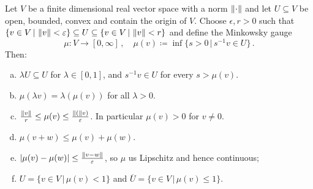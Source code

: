 \begin{lemma}\label{lem:orient-MinkowskyGauge}
    Let $V$ be a finite dimensional real vector space with a norm $\left\lVert\cdot\right\rVert$ and let $U\subseteq V$ be open, bounded, convex and contain the origin of $V$. Choose $\epsilon,r>0$ such that
    $\{v\in V\,|\, \left\lVert v\right\rVert< \varepsilon\}\subseteq U\subseteq \{v\in V\,|\,\left\lVert v\right\rVert<r\}$
    and define the Minkowsky gauge
\begin{equation*}
        \mu: V \to [0,\infty]\,,\quad \mu(v)\coloneq \inf\{s>0\,|\, s^{-1}v\in U\}\,.
    \end{equation*} 
    Then:
    \begin{enumerate}[(a)]
        \item $\lambda U \subseteq U$ for $\lambda \in [0,1]$, and $s^{-1}v\in U$ for every $s>\mu(v)$.
        \item $\mu(\lambda v)=\lambda(\mu(v))$ for all $\lambda>0$.
        \item $\frac{\left\lVert v\right\rVert}{r}\leq \mu(v)\leq \frac{\left\lVert(\right\rVert v)}{\varepsilon}$. In particular $\mu(v)>0$ for $v\neq 0$.
        \item $\mu(v+w)\leq \mu(v)+\mu(w)$.
        \item $\lvert\mu(v)-\mu(w)\rvert\leq \frac{\left\lVert v-w\right\rVert}{\varepsilon}$, so $\mu$ us Lipschitz and hence continuous;
        \item $U=\{v\in V\,|\,\mu(v)< 1\}$ and $\overline{U}=\{v\in V\,|\,\mu(v)\leq 1 \}$.
    \end{enumerate}
    
\end{lemma}
